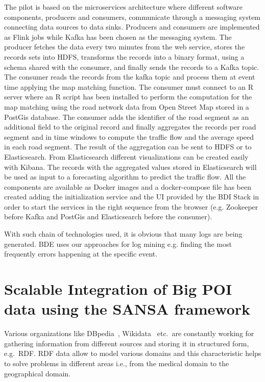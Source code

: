 The pilot is based on the microservices architecture where different software components, producers and consumers, communicate through a messaging system connecting data sources to data sinks.
Producers and consumers are implemented as Flink jobs while Kafka has been chosen as the messaging system.
The producer fetches the data every two minutes from the web service, stores the records sets into \gls{HDFS}, transforms the records into a binary format, using a schema shared with the consumer, and finally sends the records to a Kafka topic. 
The consumer reads the records from the kafka topic and process them at event time applying the map matching function. 
The consumer must connect to an R server where an R script has been installed to perform the computation for the map matching using the road network data from Open Street Map stored in a PostGis database. 
The consumer adds the identifier of the road segment as an additional field to the original record and finally aggregates the records per road segment and in time windows to compute the traffic flow and the average speed in each road segment. 
The result of the aggregation can be sent to \gls{HDFS} or to Elasticsearch. 
From Elasticsearch different visualizations can be created easily with Kibana. 
The records with the aggregated values stored in Elasticsearch will be used as input to a forecasting algorithm to predict the traffic flow. 
All the components are available as Docker images and a docker-compose file has been created adding the initialization service and the UI provided by the BDI Stack in order to start the services in the right sequence from the browser (e.g. Zookeeper before Kafka and PostGis and Elasticsearch before the consumer).

With such chain of technologies used, it is obvious that many logs are being generated.
BDE uses our approaches for log mining e.g. finding the most frequently errors happening at the specific event.


\section{Scalable Integration of Big POI data using the SANSA framework}
\label{sec:slipo-use-case}

Various organizations like DBpedia~\cite{dbpedia-swj}, Wikidata~\cite{Vrandecic:2014:WFC:2661061.2629489} etc.\ are constantly working for gathering information from different sources and storing it in structured form, e.g.~\gls{RDF}.
\gls{RDF} data allow to model various domains and this characteristic helps to solve problems in different areas i.e., from the medical domain to the geographical domain. 


